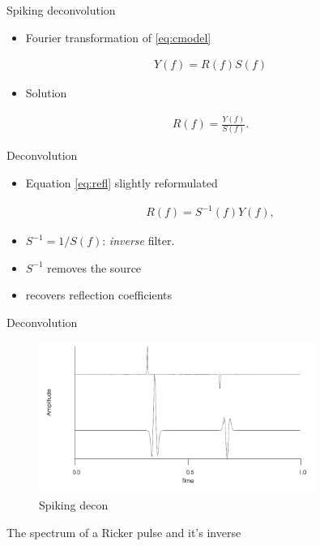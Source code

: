 \documentclass[xcolor=dvipsnames,notes]{beamer}
\begin{document}
%
\begin{frame}{Spiking deconvolution}
\sf\Large 
\begin{itemize}
  \item Fourier transformation of \eqref{eq:cmodel}
\end{itemize}
%
\begin{eqnarray}
  Y(f) = R(f) S(f)
      \label{eq:cmodel-four}
\end{eqnarray}
%
\begin{itemize}
  \item Solution
\end{itemize}
%
\begin{eqnarray}
  R(f) = \frac{Y(f)}{S(f)}.
      \label{eq:refl}
\end{eqnarray}
\end{frame}
%
\begin{frame}{Deconvolution}
\begin{itemize}
 \item Equation \eqref{eq:refl} slightly reformulated 
\end{itemize}
%
\begin{eqnarray}
  R(f) = S^{-1}(f)Y(f),
      \label{eq:inv}
\end{eqnarray}
%
\begin{itemize}
\item $S^{-1}=1/S(f)$: {\em inverse} filter.
\item
$S^{-1}$ removes the source
\item recovers reflection coefficients
\end{itemize}
\end{frame}
%
\begin{frame}{Deconvolution}
%
\begin{figure}
\includegraphics[width=0.8\textwidth]{Fig/fdecon2}
\caption{Spiking decon}
\end{figure}
%
The spectrum of a Ricker pulse and it's inverse
\end{frame}
\end{document}
